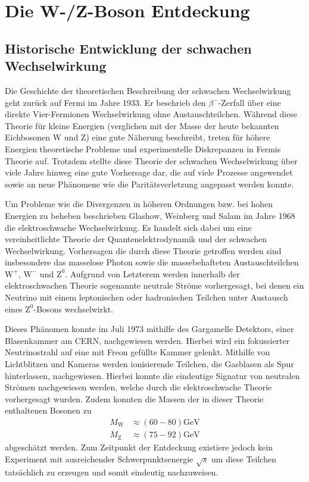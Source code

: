 
\section{Die W-/Z-Boson Entdeckung}


\subsection{Historische Entwicklung der schwachen Wechselwirkung}

Die Geschichte der theoretischen Beschreibung der schwachen Wechselwirkung geht zurück auf Fermi im Jahre 1933.
Er beschrieb den $\beta^-$-Zerfall über eine direkte Vier-Fermionen Wechselwirkung ohne Austauschteilchen.
Während diese Theorie für kleine Energien (verglichen mit der Masse der heute bekannten Eichbosonen W und Z) eine gute Näherung beschreibt, treten für höhere Energien theoretische Probleme und experimentelle Diskrepanzen in Fermis Theorie auf.
Trotzdem stellte diese Theorie der schwachen Wechselwirkung über viele Jahre hinweg eine gute Vorhersage dar, die auf viele Prozesse angewendet sowie an neue Phänomene wie die Paritätsverletzung angepasst werden konnte.

Um Probleme wie die Divergenzen in höheren Ordnungen bzw. bei hohen Energien zu beheben beschrieben Glashow, Weinberg und Salam im Jahre 1968 die elektroschwache Wechselwirkung.
Es handelt sich dabei um eine vereinheitlichte Theorie der Quantenelektrodynamik und der schwachen Wechselwirkung.
Vorhersagen die durch diese Theorie getroffen werden sind insbesondere das masselose Photon sowie die massebehafteten Austauschteilchen $\text{W}^+$, $\text{W}^-$ und $\text{Z}^0$.
Aufgrund von Letzterem werden innerhalb der elektroschwachen Theorie sogenannte neutrale Ströme vorhergesagt, bei denen ein Neutrino mit einem leptonischen oder hadronischen Teilchen unter Austausch eines $\text{Z}^0$-Bosons wechselwirkt.

Dieses Phänomen konnte im Juli 1973 mithilfe des Gargamelle Detektors, einer Blasenkammer am CERN, nachgewiesen werden.
Hierbei wird ein fokussierter Neutrinostrahl auf eine mit Freon gefüllte Kammer gelenkt. 
Mithilfe von Lichtblitzen und Kameras werden ionisierende Teilchen, die Gasblasen als Spur hinterlassen, nachgewiesen.
Hierbei konnte die eindeutige Signatur von neutralen Strömen nachgewiesen werden, welche durch die elektroschwache Theorie vorhergesagt wurden.
Zudem konnten die Massen der in dieser Theorie enthaltenen Bosonen zu 
\begin{align*}
	M_\text{W} &\approx \left(60-80\right)\si{\giga\electronvolt}\\
	M_\text{Z} &\approx \left(75-92\right)\si{\giga\electronvolt}
\end{align*}
abgeschätzt werden.
Zum Zeitpunkt der Entdeckung existiere jedoch kein Experiment mit ausreichender Schwerpunktsenergie $\sqrt{s}$ um diese Teilchen tatsächlich zu erzeugen und somit eindeutig nachzuweisen.

